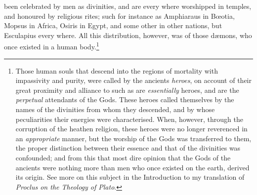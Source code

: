 \documentclass[twoside]{article}
\begin{document}
been celebrated by men as divinities, and are every where worshipped in
temples, and honoured by religious rites; such for instance as Amphiaraus in
B{\oe}otia, Mopsus in Africa, Osiris in Egypt, and some other in other nations,
but Esculapius every where. All this distribution, however, was of those
d{\ae}mons, who once existed in a human body.\footnote{Those human souls that
descend into the regions of mortality with impassivity and purity, were called
by the ancients \textit{heroes}, on account of their great proximity and
alliance to such as are \textit{essentially} heroes, and are the
\textit{perpetual} attendants of the Gods. These heroes called themselves by
the names of the divinities from whom they descended, and by whose
peculiarities their energies were characterised. When, however, through the
corruption of the heathen religion, these heroes were no longer reverenced in
an \textit{appropriate} manner, but the worship of the Gods was transferred to
them, the proper distinction between their essence and that of the divinities
was confounded; and from this that most dire opinion that the Gods of the
ancients were nothing more than men who once existed on the earth, derived its
origin. See more on this subject in the Introduction to my translation of
\textit{Proclus on the Theology of Plato}.}
\end{document}
